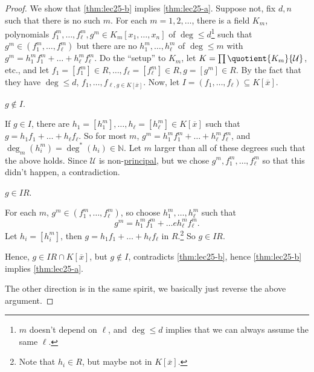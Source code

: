\begin{proof}
	We show that \autoref{thm:lec25-b} implies \autoref{thm:lec25-a}. Suppose not, fix \(d, n\) such that there is no such \(m\). For each \(m = 1, 2, \dots \), there is a field \(K_m\), polynomials \(f_1^m, \dots , f_{\ell }^m, g^m \in K_m[x_1, \dots , x_n]\) of \(\deg \leq d\)\footnote{\(m\) doesn't depend on \(\ell \), and \(\deg \leq d\) implies that we can always assume the same \(\ell \).} such that \(g^m\in (f_1^m, \dots , f_{\ell }^m )\) but there are no \(h_1^m, \dots , h_{\ell } ^m \) of \(\deg \leq m\) with \(g^m = h_1^m f_1^m + \dots + h_{\ell }^m f_{\ell }^m \). Do the ``setup'' to \(K_m\), let \(K = \prod \quotient{K_m}{\mathcal{U} } \), etc., and let \(f_1 = [f_1^{m} ]\in R, \dots , f_{\ell } = [f_{\ell }^m ]\in R , g = [g^m]\in R\). By the fact that they have \(\deg \leq d\), \(f_1, \dots , f_{\ell , g\in K[\overline{x} ]} \). Now, let \(I = (f_1, \dots , f_{\ell } ) \subseteq K[\overline{x} ]\).

	\begin{claim}
		\(g \notin I\).
	\end{claim}
	\begin{explanation}
		If \(g\in I\), there are \(h_1 = [h_1^m], \dots , h_{\ell } = [h_{\ell }^m ] \in K[\overline{x} ]\) such that \(g = h_1 f_1 + \dots + h_{\ell } f_{\ell } \). So for most \(m\), \(g^m = h_1^m f_1^m + \dots + h_{\ell }^m f_{\ell }^m \), and \(\deg_m(h_i^m) = \deg^{\ast} (h_i) \in \mathbb{N} \). Let \(m\) larger than all of these degrees such that the above holds. Since \(\mathcal{U} \) is non-\hyperref[eg:principal-filter]{principal}, but we chose \(g^m, f_1^m, \dots , f_{\ell }^m \) so that this didn't happen, a contradiction.
	\end{explanation}

	\begin{claim}
		\(g\in IR\).
	\end{claim}
	\begin{explanation}
		For each \(m\), \(g^m \in (f_1^m, \dots , f_{\ell }^m )\), so choose \(h_1^m, \dots , h_{\ell }^m \) such that
		\[
			g^m = h_1^m f_1^m + \dots e h_{\ell } ^m f_{\ell } ^m.
		\]
		Let \(h_i = [h_i^m]\), then \(g = h_1 f_1 + \dots + h_{\ell } f_{\ell } \) in \(R\).\footnote{Note that \(h_i\in R\), but maybe not in \(K[\overline{x} ]\).} So \(g\in IR\).
	\end{explanation}

	Hence, \(g\in IR \cap K[\overline{x} ]\), but \(g \notin I\), contradicts \autoref{thm:lec25-b}, hence \autoref{thm:lec25-b} implies \autoref{thm:lec25-a}.

	The other direction is in the same spirit, we basically just reverse the above argument.
\end{proof}

